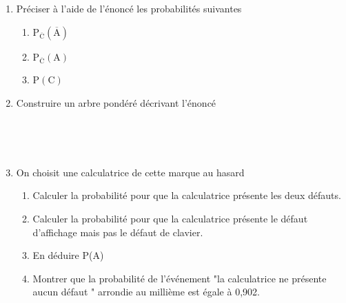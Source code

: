 \documentclass[11pt,a4paper]{article}
\newcommand{\cadre}[1]
{\begin{bclogo}[couleur = white,logo=,  arrondi = 0.1,barre=none]
~~
{%
\rule{0mm}{#1mm}}\par
\medskip
~~
\end{bclogo}}
\begin{document}
\begin{enumerate}
    \item Préciser à l'aide de l'énoncé les probabilités suivantes 
    \begin{enumerate}
        \item $\mathrm{P_{\overline{C}}(\overline{A})}$ \dotfill 
        \vspace{3mm}
        \item $\mathrm{P_{\overline{C}}(A)}$ \dotfill 
        \vspace{3mm}
        \item $\mathrm{P(C)}$ \dotfill 
        \vspace{3mm}
    \end{enumerate}
    \item Construire un arbre pondéré décrivant l'énoncé 
    \begin{center}

    \begin{minipage}{10cm}
     \cadre{30}
     \end{minipage}
             
    \end{center}

    \item On choisit une calculatrice de cette marque au hasard 

    \begin{enumerate}
        \item Calculer la probabilité pour que la calculatrice présente les deux défauts. 

        \dotfill 

        \item Calculer la probabilité pour que la calculatrice présente le défaut d'affichage mais pas le défaut de clavier. 

        \dotfill 

        \item En déduire P(A) 

        \dotfill 

        \item Montrer que la probabilité de l'événement "la calculatrice ne présente aucun défaut " arrondie au millième est égale à 0,902. 

        \dotfill 
        
        
    \end{enumerate}


\end{enumerate}
\end{document}
